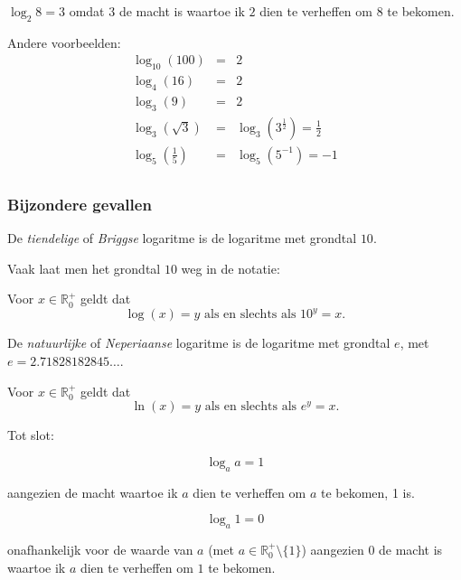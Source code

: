 \begin{voorbeeld}
	$\log_{2}8=3$ omdat $3$ de macht is waartoe ik $2$ dien te verheffen om $8$ te bekomen.
\end{voorbeeld}

\begin{voorbeeld}
	Andere voorbeelden:
	\begin{eqnarray*}
\log_{10}(100)&=&2 \\
\log_{4}(16)&=&2 \\
\log_{3}(9)&=&2 \\
\log_{3}(\sqrt{3})&=&\log_{3}(3^{\frac{1}{2}})=\frac{1}{2} \\
\log_{5}(\frac{1}{5})&=&\log_{5}(5^{-1})=-1 \\
\end{eqnarray*}
\end{voorbeeld}

\subsubsection{Bijzondere gevallen}

De \emph{tiendelige} of \emph{Briggse} logaritme is de logaritme met grondtal $10$.

Vaak laat men het grondtal $10$ weg in de notatie:

\begin{definitie}
	Voor $x \in \mathbb{R}_0^+$ geldt dat
	\begin{equation*}
	\log(x)=y \text{ als en slechts als } 10^y=x.
	\end{equation*}

\end{definitie}

De \emph{natuurlijke} of \emph{Neperiaanse} logaritme is de logaritme met grondtal $e$, met $e=2.71828182845\ldots$.

\begin{definitie}
	Voor $x \in \mathbb{R}_0^+$ geldt dat
	\begin{equation*}
	\ln(x)=y \text{ als en slechts als } e^y=x.
	\end{equation*}
\end{definitie}

Tot slot:

\begin{ftrekenregel}
		\begin{equation*}
	\log_{a}a=1
	\end{equation*}
	
	aangezien de macht waartoe ik $a$ dien te verheffen om $a$ te bekomen, 1 is.	
	
	\begin{equation*}
	\log_{a}1=0
	\end{equation*}
	
	onafhankelijk voor de waarde van $a$ (met $a \in \mathbb{R}_0^+ \setminus \{1\}$) aangezien $0$ de macht is waartoe ik $a$ dien te verheffen om $1$ te bekomen.
\end{ftrekenregel}

